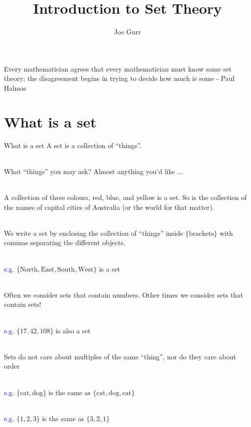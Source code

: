 \documentclass{beamer}
\begin{document}
\title{Introduction to Set Theory}
\author{Joe Gurr}
\begin{frame}
    \titlepage
\end{frame}

\begin{frame}
    \tableofcontents
    \begin{displayquote}
        Every mathematician agrees that every mathematician must know some set theory;
        the disagreement begins in trying to decide how much is some - Paul Halmos
    \end{displayquote}
\end{frame}

\section{What is a set}

\begin{frame}{What is a set}
    A set is a collection of ``things''. \\~\

    What ``things'' you may ask? Almost anything you'd like ... \\~\
\end{frame}

\begin{frame}
    A collection of three colours, red, blue, and yellow is a set. So is the collection of the names of capital cities of Australia (or the world for that matter). \\~\

    We write a set by enclosing the collection of ``things'' inside $\{\text{brackets}\}$ with commas separating the different objects. \\~\

    \textcolor{blue}{e.g.} $\{\text{North}, \text{East}, \text{South}, \text{West}\}$ is a set \\~\

    Often we consider sets that contain numbers. Other times we consider sets that contain sets! \\~\

    \textcolor{blue}{e.g.} $\{17, 42, 108\}$ is also a set \\~\
\end{frame}

\begin{frame}
    Sets do not care about multiples of the same ``thing'', nor do they care about order \\~\

    \textcolor{blue}{e.g.} $\{\text{cat}, \text{dog}\}$ is the same as $\{\text{cat}, \text{dog}, \text{cat}\}$ \\~\

    \textcolor{blue}{e.g.} $\{1, 2, 3\}$ is the same as $\{3,2,1\}$
\end{frame}
\end{document}
